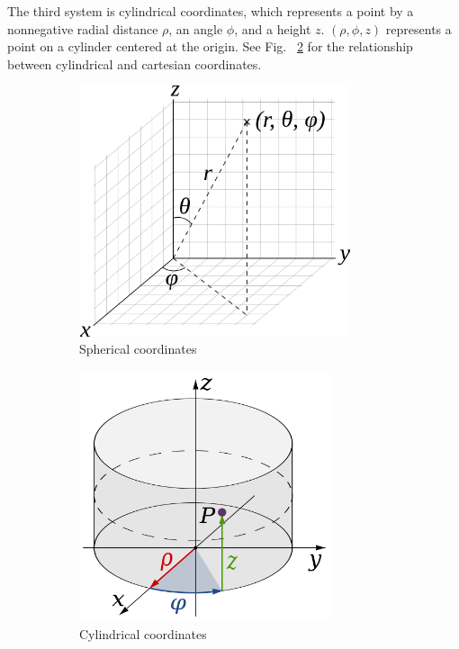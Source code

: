 \documentclass{article}
\begin{document}
\begin{enumerate}
The third system is cylindrical coordinates, which represents a point by a nonnegative radial distance $\rho$, an angle $\phi$, and a height $z$.  $(\rho, \phi, z)$ represents a point on a cylinder centered at the origin.  See Fig. ~\ref{fig:cylindrical_coords} for the relationship between cylindrical and cartesian coordinates.

\begin{figure}[h!!!]
        \centering
        \begin{subfigure}[b]{0.48\textwidth}
        \centering
        \includegraphics[height=2.9in, natwidth=610,natheight=642]{spherical}
        \caption{Spherical coordinates}
        \label{fig:spherical_coords}
        \end{subfigure}
        \quad%
        \begin{subfigure}[b]{0.48\textwidth}
        \centering
        \includegraphics[height=2.9in, natwidth=610,natheight=642]{cylindrical}
        \caption{Cylindrical coordinates}
        \label{fig:cylindrical_coords}
        \end{subfigure}
         \caption{}\label{fig:coord_systems}
\end{figure}


\end{enumerate}
\end{document}

